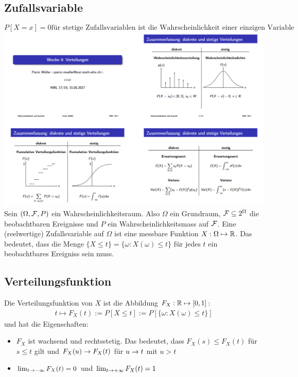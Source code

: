 \subsection*{Zufallsvariable}
\[
P[X = x] = 0 \text{für stetige Zufallsvariablen ist die Wahrscheinlichkeit einer einzigen Variable gleich 0} 
\]
\includegraphics[width=\columnwidth]{diskrete_stetige_verteilung.png}\\
Sein $ (\Omega, \mathcal{F}, P)$ ein Wahrscheinlichkeitsraum. Also $\Omega$ ein
Grundraum, $\mathcal{F} \subseteq 2^\Omega$ die beobachtbaren Ereignisse und $P$ ein
Wahrscheinlichkeitsmass auf $\mathcal{F}$. Eine (reelwertige) Zufallsvariable auf
$\Omega$ ist eine messbare Funktion $X : \Omega \mapsto \mathbb{R}$. Das bedeutet, dass
die Menge $\{X \leq t\} = \{\omega : X (\omega) \leq t\}$ für jedes $t$ ein
beobachtbares Ereigniss sein muss.
\subsection*{Verteilungsfunktion}
Die Verteilungsfunktion von $X$ ist die Abbildung $F_X : \mathbb{R} \mapsto [0, 1]$:
\begin{align*}
  t \mapsto F_X (t) := P[X \leq t] := P[\{\omega : X (\omega) \leq t\}]
\end{align*}
und hat die Eigenschaften:
\begin{itemize}
  \item $F_X$ ist wachsend und rechtsstetig. Das bedeutet,
        dass $F_X (s) \leq F_X (t)$ für $s \leq t$ gilt und $F_X (u) \rightarrow F_X (t)$
        für $u \rightarrow t$ mit $u > t$
  \item $\lim_{t \rightarrow - \infty} F_X (t) = 0$ und $\lim_{t \rightarrow + \infty} F_X (t) = 1$
\end{itemize}
\BoxStart{}
